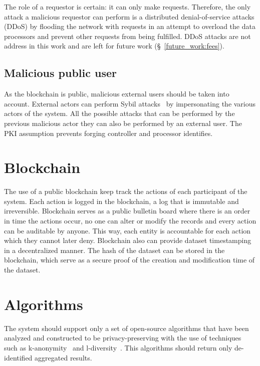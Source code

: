 The role of a requestor is certain: it can only make requests. Therefore, the only attack a malicious requestor can perform is a distributed denial-of-service attacks (DDoS) by flooding the network with requests in an attempt to overload the data processors and prevent other requests from being fulfilled. DDoS attacks are not address in this work and are left for future work (§~\ref{future_work:fees}).

\subsection{Malicious public user}
\label{solution:treat_model:mpublic_user}

As the blockchain is public, malicious external users should be taken into account. External actors can perform Sybil attacks~\cite{sybil_attack} by impersonating the various actors of the system. All the possible attacks that can be performed by the previous malicious actor they can also be performed by an external user. The PKI assumption prevents forging controller and processor identifies.

\section{Blockchain}
\label{solution:blockchain}

The use of a public blockchain keep track the actions of each participant of the system. Each action is logged in the blockchain, a log that is immutable and irreversible. Blockchain serves as a public bulletin board where there is an order in time the actions occur, no one can alter or modify the records and every action can be auditable by anyone. This way, each entity is accountable for each action which they cannot later deny. Blockchain also can provide dataset timestamping in a decentralized manner. The hash of the dataset can be stored in the blockchain, which serve as a secure proof of the creation and modification time of the dataset.

\section{Algorithms}
\label{solution:algorithms}

The system should support only a set of open-source algorithms that have been analyzed and constructed to be privacy-preserving with the use of techniques such as k-anonymity~\cite{Samarati98protectingprivacy} and l-diversity~\cite{Aggarwal2008}. This algorithms should return only de-identified aggregated results.

